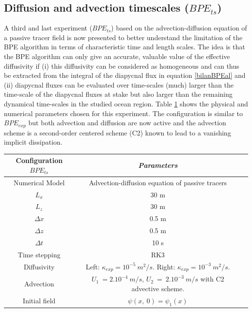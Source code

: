 \subsection{Diffusion and advection timescales ($BPE_{ts}$)}
A third and last experiment ($BPE_{ts}$) based on the advection-diffusion equation of a passive tracer field is now presented to better understand the limitation of the BPE algorithm in terms of characteristic time and length scales. The idea is that the BPE algorithm can only give an accurate, valuable value of the effective diffusivity if (i) this diffusivity can be considered as homogeneous and can thus be extracted from the integral of the diapycnal flux in equation \ref{bilanBPEal} and (ii) diapycnal fluxes can be evaluated over time-scales (much) larger than the time-scale of the diapycnal fluxes at stake but also larger than the remaining dynamical time-scales in the studied ocean region.
Table \ref{tab_NUMLAB_ts} shows the physical and numerical parameters chosen for this experiment. The configuration is similar to $BPE_{exp}$ but both advection and diffusion are now active and the advection scheme is a second-order centered scheme (C2) known to lead to a vanishing implicit dissipation.\\
\begin{table}[h]
        \centering
        \begin{tabular}{|c|c|c|}
                \hline
                Configuration $BPE_{ts}$ & \textit{Parameters}\\
                \hline 
                Numerical Model & Advection-diffusion equation of passive tracers\\
                $L_x$ & 30 m\\
                $L_z$ & 30 m\\
                $\Delta x$ & 0.5 m\\
                $\Delta z$ & 0.5 m\\
                $\Delta t$ & 10 s\\
                Time stepping & RK3 \\
                Diffusivity & Left: $\kappa_{exp} = 10^{-5} \ m^2/s$. Right: $\kappa_{exp} = 10^{-3} \ m^2/s$.\\
                Advection & $U_1\ = 2.10^{-4}\ m/s$, $U_2\ =\ 2.10^{-3}\ m/s$ with C2 advective scheme.\\
                Initial field & $\psi(x,\ 0)=\psi_1(x)$\\
                \hline
        \end{tabular}
        \label{tab_NUMLAB_ts}
\end{table}
